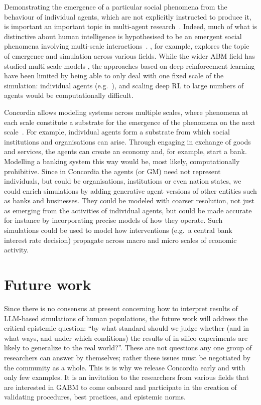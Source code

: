 \documentclass[11pt, a4paper, logo, twocolumn, internal, copyright, numbering]{googledeepmind}
\begin{document}
Demonstrating the emergence of a particular social phenomena from the behaviour of individual agents, which are not explicitly instructed to produce it, is important an important topic in multi-agent research~\citep{walker1995understanding,leibo2019autocurricula, leibo2021meltingpot,axtell2001emergence}. Indeed, much of what is distinctive about human intelligence is hypothesised to be an emergent social phenomena involving multi-scale interactions~\citep{henrich2016secret, wilson2013generalizing}. \cite{delanda2011philosophy}, for example, explores the topic of emergence and simulation across various fields. While the wider ABM field has studied multi-scale models \citep{tesfatsion2023agent}, the approaches based on deep reinforcement learning have been limited by being able to only deal with one fixed scale of the simulation: individual agents (e.g.~\cite{johanson2022emergent, zheng2022ai}), and scaling deep RL to large numbers of agents would be computationally difficult.

Concordia allows modeling systems across multiple scales, where phenomena at each scale constitute a substrate for the emergence of the phenomena on the next scale~\citep{koestler1967ghost, delanda2011philosophy, duenez2023social}. For example, individual agents form a substrate from which social institutions and organisations can arise. Through engaging in exchange of goods and services, the agents can create an economy and, for example, start a bank. Modelling a banking system this way would be, most likely, computationally prohibitive.
Since in Concordia the agents (or GM) need not represent individuals, but could be organisations, institutions or even nation states, we could enrich simulations by adding generative agent versions of other entities such as banks and businesses. They could be modeled with coarser resolution, not just as emerging from the activities of individual agents, but could be made accurate for instance by incorporating precise models of how they operate. 
Such simulations could be used to model how interventions (e.g.~a central bank interest rate decision) propagate across macro and micro scales of economic activity.

\section{Future work}
\label{sec:future_work}

Since there is no consensus at present concerning how to interpret results of LLM-based simulations of human populations, the future work will address the critical epistemic question: ``by what standard should we judge whether (and in what ways, and under which conditions) the results of in silico experiments are likely to generalize to the real world?''. These are not questions any one group of researchers can answer by themselves; rather these issues must be negotiated by the community as a whole.  This is is why we release Concordia early and with only few examples. It is an invitation to the researchers from various fields that are interested in GABM to come onboard and participate in the creation of validating procedures, best practices, and epistemic norms.
\end{document}
